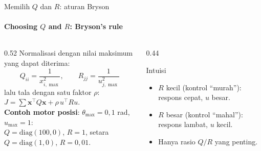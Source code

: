 \documentclass[aspectratio=169,10pt]{beamer}
\begin{document}
\begin{frame}{Memilih $Q$ dan $R$: aturan Bryson}
	\framesubtitle{Choosing $Q$ and $R$: Bryson's rule}
	\begin{columns}[T]
		\begin{column}{0.52\textwidth}
			\small
			Normalisasi dengan nilai maksimum yang dapat diterima:
			\[
				Q_{ii} = \frac{1}{x_{i,\max}^2},\qquad R_{jj} = \frac{1}{u_{j,\max}^2}
			\]
			lalu tala dengan satu faktor $\rho$: $J = \sum \mathbf{x}^\top Q\mathbf{x} + \rho\,u^\top Ru$.\\[4pt]
			\textbf{Contoh motor posisi}: $\theta_{\max} = 0{,}1$ rad, $u_{\max} = 1$:\\
			$Q = \text{diag}(100, 0)$, $R = 1$, setara $Q = \text{diag}(1,0)$, $R = 0{,}01$.
		\end{column}
		\begin{column}{0.44\textwidth}
			\begin{alertblock}{Intuisi}
				\small
				\begin{itemize}
					\item $R$ kecil (kontrol ``murah''): respons cepat, $u$ besar.
					\item $R$ besar (kontrol ``mahal''): respons lambat, $u$ kecil.
					\item Hanya rasio $Q/R$ yang penting.
				\end{itemize}
			\end{alertblock}
		\end{column}
	\end{columns}
\end{frame}
\end{document}
